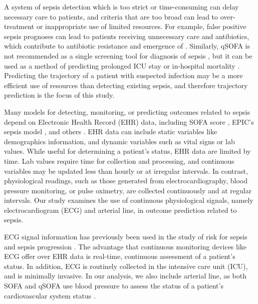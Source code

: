 A system of sepsis detection which is too strict or time-consuming can delay necessary care to patients, and criteria that are too broad can lead to over-treatment or inappropriate use of limited resources. For example, false positive sepsis prognoses can lead to patients receiving unnecessary care and antibiotics, which contribute to antibiotic resistance and emergence of  \autocite{vanepps_reducing_2018, prestinaci_antimicrobial_2015, chokshi_global_2019}. Similarly, qSOFA is not recommended as a single screening tool for diagnosis of sepsis \autocite{evans_surviving_2021}, but it can be used as a method of predicting prolonged ICU stay or in-hospital mortality \autocite{seymour_assessment_2016}. Predicting the trajectory of a patient with suspected infection may be a more efficient use of resources than detecting existing sepsis, and therefore trajectory prediction is the focus of this study. 

Many models for detecting, monitoring, or predicting outcomes related to sepsis depend on Electronic Health Record (EHR) data, including SOFA score \autocite{sepsis-3}, EPIC's sepsis model \autocite{wong_external_2021}, and others \autocite{nesaragi_correlation_2021, morrill_signature_2019, taylor_prediction_2016}. EHR data can include static variables like demographics information, and dynamic variables such as vital signs or lab values. While useful for determining a patient's status, EHR data are limited by time. Lab values require time for collection and processing, and continuous variables may be updated less than hourly or at irregular intervals. In contrast, physiological readings, such as those generated from electrocardiography, blood pressure monitoring, or pulse oximetry, are collected continuously and at regular intervals. Our study examines the use of continuous physiological signals, namely electrocardiogram (ECG) and arterial line, in outcome prediction related to sepsis.

ECG signal information has previously been used in the study of risk for sepsis and sepsis progression \autocite{berger_shock_2013, moorman_cardiovascular_2011, nemati_interpretable_2018}. The advantage that continuous monitoring devices like ECG offer over EHR data is real-time, continuous assessment of a patient's status. In addition, ECG is routinely collected in the intensive care unit (ICU), and is minimally invasive. In our analysis, we also include arterial line, as both SOFA and qSOFA use blood pressure to assess the status of a patient's cardiovascular system status \autocite{sepsis-3}.

